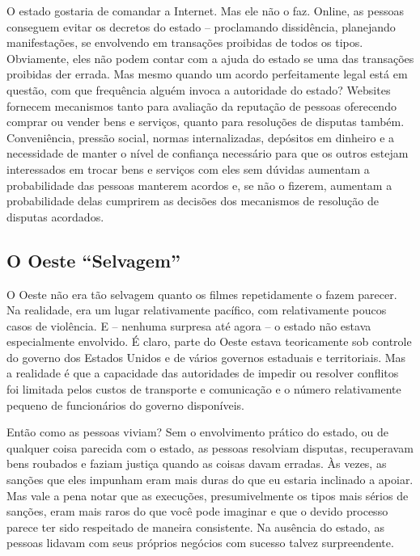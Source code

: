 O estado gostaria de comandar a Internet. Mas ele não o faz. Online, as pessoas conseguem evitar os decretos do estado -- proclamando dissidência, planejando manifestações, se envolvendo em transações proibidas de todos os tipos. Obviamente, eles não podem contar com a ajuda do estado se uma das transações proibidas der errada. Mas mesmo quando um acordo perfeitamente legal está em questão, com que frequência alguém invoca a autoridade do estado? Websites fornecem mecanismos tanto para avaliação da reputação de pessoas oferecendo comprar ou vender bens e serviços, quanto para resoluções de disputas também. Conveniência, pressão social, normas internalizadas, depósitos em dinheiro e a necessidade de manter o nível de confiança necessário para que os outros estejam interessados em trocar bens e serviços com eles sem dúvidas aumentam a probabilidade das pessoas manterem acordos e, se não o fizerem, aumentam a probabilidade delas cumprirem as decisões dos mecanismos de resolução de disputas acordados.

\subsection*{O Oeste ``Selvagem'' }

O Oeste não era tão selvagem quanto os filmes repetidamente o fazem parecer. Na realidade, era um lugar relativamente pacífico, com relativamente poucos casos de violência. E -- nenhuma surpresa até agora -- o estado não estava especialmente envolvido. É claro, parte do Oeste estava teoricamente sob controle do governo dos Estados Unidos e de vários governos estaduais e territoriais. Mas a realidade é que a capacidade das autoridades de impedir ou resolver conflitos foi limitada pelos custos de transporte e comunicação e o número relativamente pequeno de funcionários do governo disponíveis.

Então como as pessoas viviam? Sem o envolvimento prático do estado, ou de qualquer coisa parecida com o estado, as pessoas resolviam disputas, recuperavam bens roubados e faziam justiça quando as coisas davam erradas. Às vezes, as sanções que eles impunham eram mais duras do que eu estaria inclinado a apoiar. Mas vale a pena notar que as execuções, presumivelmente os tipos mais sérios de sanções, eram mais raros do que você pode imaginar e que o devido processo parece ter sido respeitado de maneira consistente. Na ausência do estado, as pessoas lidavam com seus próprios negócios com sucesso talvez surpreendente.


